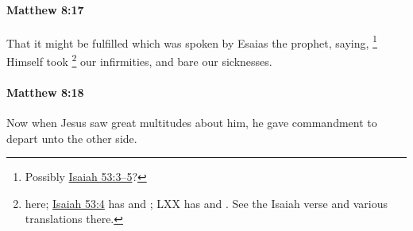 		\paragraph{Matthew 8:17} %
			\label{MATTHEW-8-17}

			That it might be fulfilled which was spoken by Esaias the prophet, saying,%
				\footnote{%
					Possibly \hyperref[ISAIAH-53-3]{Isaiah 53:3--5}?
					} 
			Himself took%
				\footnote{%
					 here; \hyperref[ISAIAH-53-4]{Isaiah 53:4} has  and ; LXX has  and . See the Isaiah verse and various translations there.
					}
			our infirmities, and bare our sicknesses.

			\begin{framed}
			\scriptsize
				\begin{compactdesc}
					\item[SBLG] 
				\end{compactdesc}
			\end{framed}

		\paragraph{Matthew 8:18} %
			\label{MATTHEW-8-18}

			Now when Jesus saw great multitudes about him, he gave commandment to depart unto the other side.

